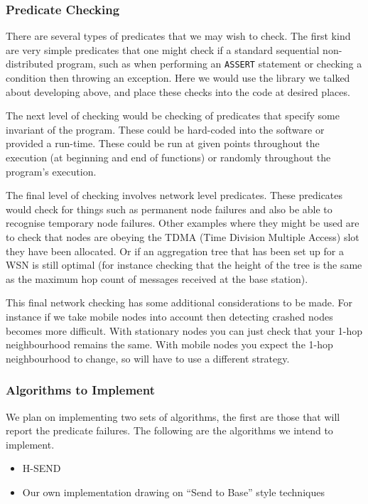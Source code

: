 \documentclass[a4paper]{article}
\begin{document}
\subsubsection{Predicate Checking}

There are several types of predicates that we may wish to check. The first kind
are very simple predicates that one might check if a standard sequential
non-distributed program, such as when performing an \verb|ASSERT| statement or
checking a condition then throwing an exception. Here we would use the library
we talked about developing above, and place these checks into the code at
desired places.

The next level of checking would be checking of predicates that specify some
invariant of the program. These could be hard-coded into the software or
provided a run-time. These could be run at given points throughout the execution
(at beginning and end of functions) or randomly throughout the program's
execution.

The final level of checking involves network level predicates. These predicates
would check for things such as permanent node failures and also be able to
recognise temporary node failures. Other examples where they might be used are
to check that nodes are obeying the TDMA (Time Division Multiple Access) slot
they have been allocated. Or if an aggregation tree \cite{TankBible} that has
been set up for a WSN is still optimal (for instance checking that the height of
the tree is the same as the maximum hop count of messages received at the base
station).

This final network checking has some additional considerations to be made. For
instance if we take mobile nodes into account then detecting crashed nodes
becomes more difficult. With stationary nodes you can just check that your 1-hop
neighbourhood remains the same. With mobile nodes you expect the 1-hop
neighbourhood to change, so will have to use a different strategy.


\subsubsection{Algorithms to Implement}

We plan on implementing two sets of algorithms, the first are those that will
report the predicate failures. The following are the algorithms we intend to
implement.

\begin{itemize}
	\item H-SEND \cite{herbert2007adaptive}
	\item Our own implementation drawing on ``Send to Base'' style techniques
\end{itemize}
\end{document}
